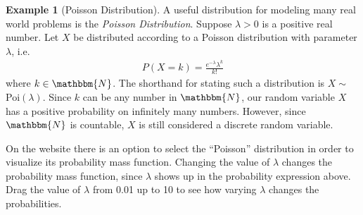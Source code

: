 \documentclass{tufte-book}
\newcommand\nat{\mathbbm{N}}
\theoremstyle{definition}
\numberwithin{theorem}{section}
\numberwithin{definition}{section}
\numberwithin{lemma}{section}
\numberwithin{corollary}{section}
\numberwithin{proposition}{section}
\numberwithin{remark}{section}
\numberwithin{claim}{section}
\numberwithin{observation}{section}
\numberwithin{fact}{section}
\numberwithin{assumption}{section}
\newtheorem{example}[theorem]{Example}
\numberwithin{example}{section}
\numberwithin{exercise}{section}
\begin{document}
\begin{example}[Poisson Distribution]
A useful distribution for modeling many real world problems is the \textit{Poisson Distribution}. Suppose $\lambda > 0$ is a positive real number. Let $X$ be distributed according to a Poisson distribution with parameter $\lambda$, i.e.
\begin{align*}
P(X = k) = \frac{e^{-\lambda}\lambda^k}{k!}
\end{align*}
where $k \in \nat$. The shorthand for stating such a distribution is $X \sim$ Poi$(\lambda)$. Since $k$ can be any number in $\nat$, our random variable $X$ has a positive probability on infinitely many numbers. However, since $\nat$ is countable, $X$ is still considered a discrete random variable. 

On the website there is an option to select the ``Poisson'' distribution in order to visualize its probability mass function. Changing the value of $\lambda$ changes the probability mass function, since $\lambda$ shows up in the probability expression above. Drag the value of $\lambda$ from 0.01 up to 10 to see how varying $\lambda$ changes the probabilities.
\end{example}
\end{document}
